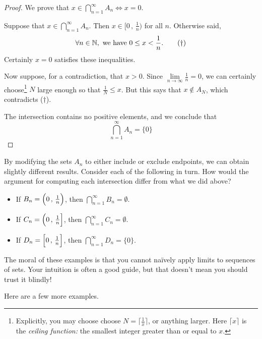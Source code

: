 \begin{proof}
	We prove that $x\in\bigcap\limits_{n=1}^\infty A_n\iff x=0$.\par
	Suppose that $x\in\bigcap\limits_{n=1}^\infty A_n$. Then $x\in\bigl[0\,,\,\frac 1n\bigr)$ for all $n$. Otherwise said,
	\[
		\forall n\in\mathbb{N},\text{ we have }0\le x<\frac 1n.\tag{$\dag$}
	\]
	Certainly $x=0$ satisfies these inequalities.\par
	Now suppose, for a contradiction, that $x>0$. Since $\lim\limits_{n\to\infty}\frac 1n=0$, we can certainly choose\footnote{Explicitly, you may choose choose $N=\lceil\frac 1x\rceil$, or anything larger. Here $\lceil x\rceil$ is the \emph{ceiling function:} the smallest integer greater than or equal to $x$.} $N$ large enough so that $\frac 1N\le x$. But this says that $x\not\in A_N$, which contradicts ($\dag$).\par
	The intersection contains no positive elements, and we conclude that
	\[
		\bigcap\limits_{n=1}^\infty A_n=\{0\}\tag*{\qedhere}
	\]
\end{proof}

By modifying the sets $A_n$ to either include or exclude endpoints, we can obtain slightly different results. Consider each of the following in turn. How would the argument for computing each intersection differ from what we did above?
\begin{itemize}
  \item If $B_n=\Bigl(0\,,\,\frac 1n\Bigr)$, then $\bigcap\limits_{n=1}^\infty B_n=\emptyset$.
  \item If $C_n=\Bigl(0\,,\,\frac 1n\Bigr]$, then $\bigcap\limits_{n=1}^\infty C_n=\emptyset$.
  \item If $D_n=\Bigl[0\,,\,\frac 1n\Bigr]$, then $\bigcap\limits_{n=1}^\infty D_n=\{0\}$.
\end{itemize}
The moral of these examples is that you cannot naïvely apply limits to sequences of sets. Your intuition is often a good guide, but that doesn't mean you should trust it blindly!\par

Here are a few more examples.


